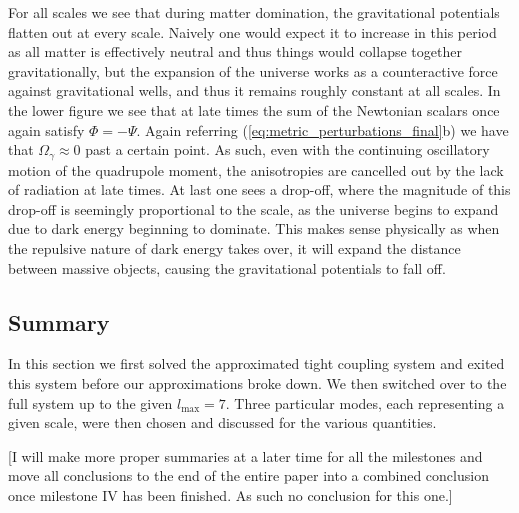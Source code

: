 \documentclass[%
reprint,
 amsmath,amssymb,
 aps,
]{revtex4-2}
\begin{document}
For all scales we see that during matter domination, the gravitational potentials flatten out at every scale. Naively one would expect it to increase in this period as all matter is effectively neutral and thus things would collapse together gravitationally, but the expansion of the universe works as a counteractive force against gravitational wells, and thus it remains roughly constant at all scales. In the lower figure we see that at late times the sum of the Newtonian scalars once again satisfy $\Phi=-\Psi$. Again referring (\ref{eq:metric_perturbations_final}b) we have that $\Omega_\gamma\approx0$ past a certain point. As such, even with the continuing oscillatory motion of the quadrupole moment, the anisotropies are cancelled out by the lack of radiation at late times.  At last one sees a drop-off, where the magnitude of this drop-off is seemingly proportional to the scale, as the universe begins to expand due to dark energy beginning to dominate. This makes sense physically as when the repulsive nature of dark energy takes over, it will expand the distance between massive objects, causing the gravitational potentials to fall off.

\subsection{Summary}
In this section we first solved the approximated tight coupling system and exited this system before our approximations broke down. We then switched over to the full system up to the given $l_\text{max}=7$. Three particular modes, each representing a given scale, were then chosen and discussed for the various quantities. 

\color{red}[I will make more proper summaries at a later time for all the milestones and move all conclusions to the end of the entire paper into a combined conclusion once milestone IV has been finished. As such no conclusion for this one.]\color{black}
\end{document}
